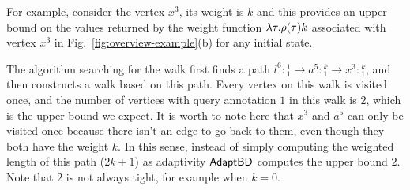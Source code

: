 For example, consider the vertex $x^{3}$, its weight is $k$ and this provides an upper bound on the values returned by the weight function $\lambda \mathtt{\tau}. \rho(\mathtt{\tau})k$ associated with vertex $x^{3}$ in Fig.~\ref{fig:overview-example}(b) for any initial state. 

The algorithm searching for the walk first finds a path $l^6:{}^1_1 \to a^5: {}^k_1 \to x^3: {}^k_1$, and then constructs a walk based on this path. Every vertex on this walk is visited once, and the number of vertices with query annotation $1$ in this walk is $2$, which is the upper bound we expect.
{It is worth to note here that $x^3$ and $a^5$ can only be visited once because there isn't an edge to go back to them, even though they both have the weight $k$}.
In this sense, instead of simply computing the weighted length of this path ($2k+1$) as adaptivity $\mathsf{AdaptBD}$ computes the upper bound $2$. Note that $2$ is not always tight, for example when $k = 0$.
